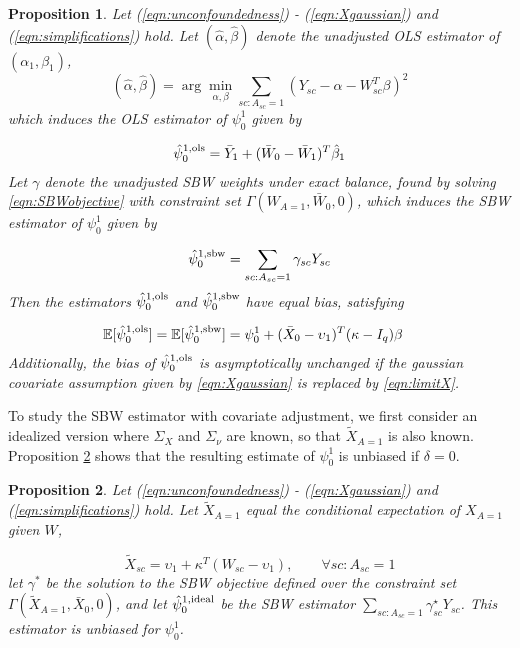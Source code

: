 \documentclass[aoas]{imsart}
\theoremstyle{plain}
\newtheorem{proposition}{Proposition}
\theoremstyle{remark}
\begin{document}
\begin{appendix}
\begin{proposition}\label{cl1}
Let (\ref{eqn:unconfoundedness}) - (\ref{eqn:Xgaussian}) and (\ref{eqn:simplifications}) hold.
Let $(\hat{\alpha}, \hat{\beta})$ denote the unadjusted OLS estimator of $(\alpha_1, \beta_1)$, 
\begin{equation}\label{eqn:prop1.beta}
(\hat{\alpha}, \hat{\beta}) = \arg \min_{\alpha, \beta} \sum_{sc:A_{sc}=1} (Y_{sc} - \alpha -  W_{sc}^T\beta)^2
\end{equation}
which induces the OLS estimator of $\psi_0^1$ given by

\begin{align*}
\hat{\psi}^{1,\textup{ols}}_0 = \bar{Y}_1 + (\bar{W}_0 - \bar{W}_1)^T\hat{\beta}_1
\end{align*}
%
Let ${\gamma}$ denote the unadjusted SBW weights under exact balance, found by solving \eqref{eqn:SBWobjective} with constraint set $\Gamma( W_{A=1}, \bar{W}_0, 0)$, which induces the SBW estimator of $\psi_0^1$ given by

\begin{align*}
\hat{\psi}^{1,\textup{sbw}}_0 = \sum_{sc: A_{sc} = 1} {\gamma}_{sc} Y_{sc}
\end{align*}
%
Then the estimators $\hat{\psi}^{1, \textup{ols}}_0$ and $\hat{\psi}^{1, \textup{sbw}}_0$ have equal bias, satisfying

\begin{align*}
\mathbb{E}[\hat{\psi}_0^{1,\textup{ols}}] &= \mathbb{E}[\hat{\psi}^{1, \textup{sbw}}_0]  = \psi_0^1 + (\bar{X}_0 - \upsilon_1)^T(\mathbf{\kappa} - I_q)\beta
\end{align*}
Additionally, the bias of $\hat{\psi}_0^{1,\textup{ols}}$ is asymptotically unchanged if the gaussian covariate assumption given by \eqref{eqn:Xgaussian} is replaced by \eqref{eqn:limitX}.
\end{proposition}

To study the SBW estimator with covariate adjustment, we first consider an idealized version where $\Sigma_X$ and $\Sigma_\nu$ are known, so that $\tilde{X}_{A=1}$ is also known. Proposition \ref{cl2} shows that the resulting estimate of $\psi_0^1$ is unbiased if $\delta = 0$.

\begin{proposition}\label{cl2}
Let (\ref{eqn:unconfoundedness}) - (\ref{eqn:Xgaussian}) and (\ref{eqn:simplifications}) hold. Let $\tilde{X}_{A=1}$ equal the conditional expectation of $X_{A=1}$ given $W$,

\[ \tilde{X}_{sc} = \upsilon_1 + \kappa^T (W_{sc} - \upsilon_1), \qquad \forall sc: A_{sc} = 1\] let $\gamma^*$ be the solution to the SBW objective defined over the constraint set $\Gamma(\tilde{X}_{A=1}, \bar{X}_0, 0)$, and let $\hat{\psi}^{1, \textup{ideal}}_0$ be the SBW estimator $\sum_{sc: A_{sc} = 1}\gamma^\star_{sc}Y_{sc}$. This estimator is unbiased for $\psi_0^1$.
\end{proposition}


\end{appendix}
\end{document}
